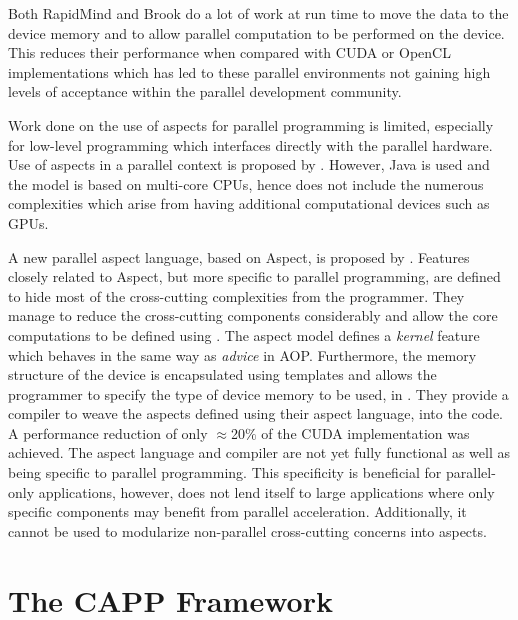 \documentclass{sig-alternate-05-2015}
\begin{document}
Both RapidMind and Brook do a lot of work at run time to move the data to 
the device memory and to allow parallel computation to be performed on the
device. This
reduces their performance when compared with CUDA or OpenCL implementations 
\cite{rmindperf} which has led to these parallel environments not
gaining high levels of acceptance within the parallel development community.

Work done on the use of aspects for parallel programming is limited, especially
for low-level programming which interfaces directly with the parallel hardware.
Use of aspects in a parallel context is proposed by \cite{jaspect}.
However, Java is used and the model is based on multi-core CPUs, hence does not include the
numerous complexities which arise from having additional computational devices such
as GPUs.

A new parallel aspect language, based on Aspect\CPP, is proposed by
\cite{wang:aosp}. Features closely related to Aspect\CPP, but more specific to
parallel programming, are defined to hide most of the cross-cutting complexities from the
programmer. They manage to reduce the cross-cutting components considerably
and allow the core computations to be defined using \CPP. The aspect model defines 
a \textit{kernel} feature which behaves in the same way as \textit{advice} in AOP. 
Furthermore, the memory structure of the device is encapsulated using templates and allows the
programmer to specify the type of device memory to be used, in \CPP. They
provide a compiler to weave the aspects defined using their aspect language, into 
the \CPP code. A performance reduction of only $\approx$20$\%$ of the CUDA
implementation was achieved. 
The aspect language and compiler are not yet fully functional as well as being
specific to parallel programming. This specificity is beneficial for parallel-only 
applications, however, does not lend itself to large \CPP applications
where only specific components may benefit from parallel acceleration.
Additionally, it cannot be used to modularize non-parallel cross-cutting concerns into
aspects.

\section{The CAPP Framework }\label{sec:aspects}
\end{document}
